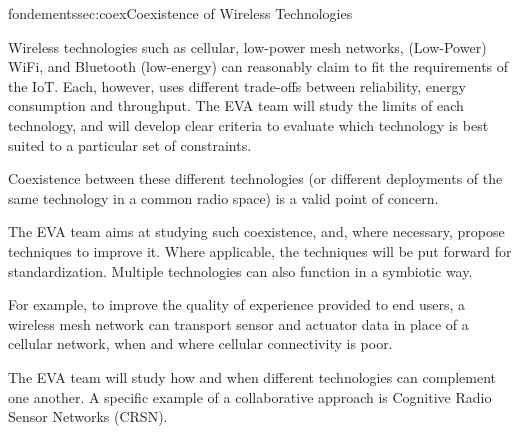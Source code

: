 \documentclass{ra2016}
\begin{document}
\begin{module}{fondements}{sec:coex}{Coexistence of Wireless Technologies}

Wireless technologies such as cellular, low-power mesh networks, (Low-Power) WiFi, and Bluetooth (low-energy) can reasonably claim to fit the requirements of the IoT.
Each, however, uses different trade-offs between reliability, energy consumption and throughput.
The EVA team will study the limits of each technology, and will develop clear criteria to evaluate which technology is best suited to a particular set of constraints.

Coexistence between these different technologies (or different deployments of the same technology in a common radio space) is a valid point of concern.

The EVA team aims at studying such coexistence, and, where necessary, propose techniques to improve it.
Where applicable, the techniques will be put forward for standardization.
Multiple technologies can also function in a symbiotic way.

For example, to improve the quality of experience provided to end users, a wireless mesh network can transport sensor and actuator data in place of a cellular network, when and where cellular connectivity is poor.

The EVA team will study how and when different technologies can complement one another.
A specific example of a collaborative approach is Cognitive Radio Sensor Networks (CRSN).

\end{module}
\end{document}
